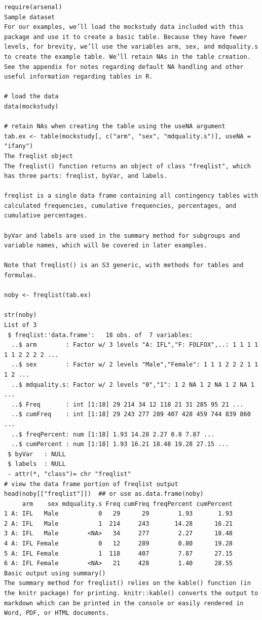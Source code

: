 \documentclass[
]{book}
\begin{document}
\begin{verbatim}
require(arsenal)
Sample dataset
For our examples, we’ll load the mockstudy data included with this package and use it to create a basic table. Because they have fewer levels, for brevity, we’ll use the variables arm, sex, and mdquality.s to create the example table. We’ll retain NAs in the table creation. See the appendix for notes regarding default NA handling and other useful information regarding tables in R.

# load the data
data(mockstudy)

# retain NAs when creating the table using the useNA argument
tab.ex <- table(mockstudy[, c("arm", "sex", "mdquality.s")], useNA = "ifany")
The freqlist object
The freqlist() function returns an object of class "freqlist", which has three parts: freqlist, byVar, and labels.

freqlist is a single data frame containing all contingency tables with calculated frequencies, cumulative frequencies, percentages, and cumulative percentages.

byVar and labels are used in the summary method for subgroups and variable names, which will be covered in later examples.

Note that freqlist() is an S3 generic, with methods for tables and formulas.

noby <- freqlist(tab.ex)

str(noby)
List of 3
 $ freqlist:'data.frame':   18 obs. of  7 variables:
  ..$ arm        : Factor w/ 3 levels "A: IFL","F: FOLFOX",..: 1 1 1 1 1 1 2 2 2 2 ...
  ..$ sex        : Factor w/ 2 levels "Male","Female": 1 1 1 2 2 2 1 1 1 2 ...
  ..$ mdquality.s: Factor w/ 2 levels "0","1": 1 2 NA 1 2 NA 1 2 NA 1 ...
  ..$ Freq       : int [1:18] 29 214 34 12 118 21 31 285 95 21 ...
  ..$ cumFreq    : int [1:18] 29 243 277 289 407 428 459 744 839 860 ...
  ..$ freqPercent: num [1:18] 1.93 14.28 2.27 0.8 7.87 ...
  ..$ cumPercent : num [1:18] 1.93 16.21 18.48 19.28 27.15 ...
 $ byVar   : NULL
 $ labels  : NULL
 - attr(*, "class")= chr "freqlist"
# view the data frame portion of freqlist output
head(noby[["freqlist"]])  ## or use as.data.frame(noby)
     arm    sex mdquality.s Freq cumFreq freqPercent cumPercent
1 A: IFL   Male           0   29      29        1.93       1.93
2 A: IFL   Male           1  214     243       14.28      16.21
3 A: IFL   Male        <NA>   34     277        2.27      18.48
4 A: IFL Female           0   12     289        0.80      19.28
5 A: IFL Female           1  118     407        7.87      27.15
6 A: IFL Female        <NA>   21     428        1.40      28.55
Basic output using summary()
The summary method for freqlist() relies on the kable() function (in the knitr package) for printing. knitr::kable() converts the output to markdown which can be printed in the console or easily rendered in Word, PDF, or HTML documents.


\end{verbatim}
\end{document}

